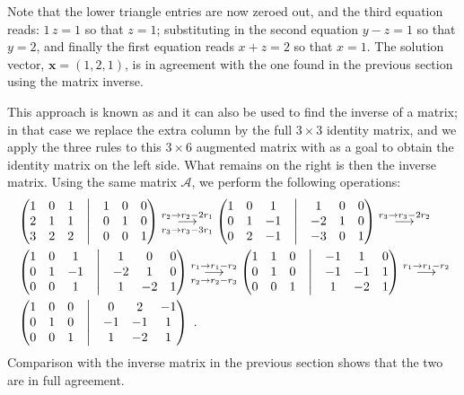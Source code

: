 Note that the lower triangle entries are now zeroed out, and the third equation reads: $1\,z=1$ so that $z=1$; substituting in the second equation $y-z=1$ so that $y=2$, and finally the first equation reads $x+z=2$ so that $x=1$. The solution vector, $\mathbf{x}=(1,2,1)$, is in agreement with the one found in the previous section using the matrix inverse.  

This approach is known as  and it can also be used to find the inverse of a matrix; in that case we replace the extra column by the full $3\times 3$ identity matrix, and we apply the three rules to this $3\times 6$ augmented matrix with as a goal to obtain the identity matrix on the left side.  What remains on the right is then the inverse matrix.  Using the same matrix $\mathcal{A}$, we perform the following operations:
{\small
\begin{equation*}
\begin{split}
&\begin{pmatrix}1&0&1&\bigm|&1 & 0 & 0\\ 2&1&1 &\bigm|&0 & 1 & 0\\ 3&2&2&\bigm|& 0 & 0 & 1\end{pmatrix}
\underset{r_3\rightarrow r_3-3r_1}{\overset{r_2\rightarrow r_2-2r_1}{\longrightarrow}}
\begin{pmatrix}1&0&1&\bigm|& 1 & 0 & 0 \\ 0&1&-1 &\bigm|& -2 & 1 & 0\\ 0&2&-1&\bigm|& -3 & 0 & 1\end{pmatrix}
\overset{r_3\rightarrow r_3-2r_2}{\longrightarrow}\\
&\begin{pmatrix}1&0&1&\bigm|&1 & 0 & 0 \\ 0&1&-1 &\bigm|&-2 & 1 & 0\\ 0&0&1&\bigm|&1 & -2 & 1\end{pmatrix}
\underset{r_2\rightarrow r_2-r_3}{\overset{r_1\rightarrow r_1-r_2}{\longrightarrow}}
\begin{pmatrix}1&1&0&\bigm|&-1 & 1 & 0 \\ 0&1&0 &\bigm|&-1 & -1 & 1\\ 0&0&1&\bigm|& 1 & -2 & 1\end{pmatrix}
\overset{r_1\rightarrow r_1-r_2}{\longrightarrow}\\
&\begin{pmatrix}1&0&0&\bigm|&0 & 2 & -1 \\ 0&1&0 &\bigm|&-1 & -1 & 1\\ 0&0&1&\bigm|& 1 & -2 & 1\end{pmatrix}\ .
\end{split}
\end{equation*}
}
Comparison with the inverse matrix in the previous section shows that the two are in full agreement.


